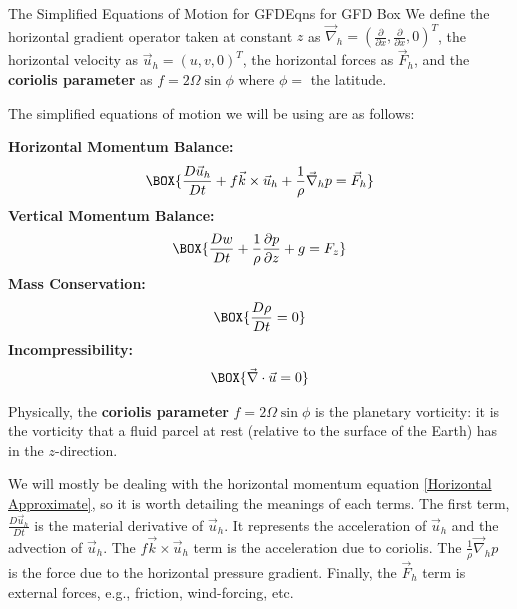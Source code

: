 \begin{fact}{The Simplified Equations of Motion for GFD}{Eqns for GFD Box}\label{Eqns for GFD Box}
    We define the horizontal gradient operator taken at constant $z$ as $\vec{\nabla}_h=\left( \frac{\partial}{\partial x},\frac{\partial}{\partial x},0 \right)^T$, the horizontal velocity as $\vec{u}_h=\left( u,v,0 \right)^T$, the horizontal forces as $\vec{F}_h$, and the \textbf{coriolis parameter} as $f=2\Omega\sin\phi$ where $\phi=$ the latitude.

    The simplified equations of motion we will be using are as follows: 
    \begin{multicols}{2}
        \textbf{Horizontal Momentum Balance:}
        \begin{gather}
            \label{Horizontal Approximate}
            \BOX{\frac{D\vec{u}_h}{Dt}+f\vec{k}\times\vec{u}_h+\frac{1}{\rho}\vec{\nabla}_hp=\vec{F}_h}
        \end{gather}
        \textbf{Vertical Momentum Balance:}
        \begin{gather}
            \label{Vertical Approximate}
            \BOX{\frac{Dw}{Dt}+\frac{1}{\rho}\frac{\partial p }{\partial z}+g=F_z}
        \end{gather}
        \textbf{Mass Conservation:}
        \begin{gather}
            \label{Mass Material Conservation}
            \BOX{\frac{D\rho}{Dt}=0}
        \end{gather}
        \textbf{Incompressibility:}
        \begin{gather}
            \label{Incompressibility}
        \BOX{\vec{\nabla}\cdot\vec{u}=0}
        \end{gather}
    \end{multicols}
\end{fact}

Physically, the \textbf{coriolis parameter} $f=2\Omega \sin \phi$ is the planetary vorticity: it is the vorticity that a fluid parcel at rest (relative to the surface of the Earth) has in the $z$-direction.

We will mostly be dealing with the horizontal momentum equation \ref{Horizontal Approximate}, so it is worth detailing the meanings of each terms. The first term, $\frac{D\vec{u}_h}{Dt}$ is the material derivative of $\vec{u}_h$. It represents the acceleration of $\vec{u}_h$ and the advection of $\vec{u}_h$. The $f\vec{k}\times\vec{u}_h$ term is the acceleration due to coriolis. The $\frac{1}{\rho}\vec{\nabla}_h p$ is the force due to the horizontal pressure gradient. Finally, the $\vec{F}_h$ term is external forces, e.g., friction, wind-forcing, etc.

